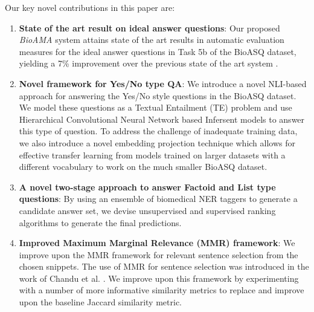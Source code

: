 \documentclass[11pt,a4paper]{article}
\begin{document}
Our key novel contributions in this paper are:
\begin{enumerate}
    \item \textbf{State of the art result on ideal answer questions}: Our proposed \textit{BioAMA} system attains state of the art results in automatic evaluation measures for the ideal answer questions in Task 5b of the BioASQ dataset, yielding a 7\%  improvement over the previous state of the art system \cite{khyati-paper}.
    \item \textbf{Novel framework for Yes/No type QA}: 
    We introduce a novel NLI-based approach for answering the Yes/No style questions in the BioASQ dataset. We model these questions as a Textual Entailment (TE) problem and use Hierarchical Convolutional Neural Network based Infersent models \cite{Infersent} to answer this type of question. To address the challenge of inadequate training data, we also introduce a novel embedding projection technique which allows for effective transfer learning from models trained on larger datasets with a different vocabulary to work on the much smaller BioASQ dataset.
    \item \textbf{A novel two-stage approach to answer Factoid and List type questions}: 
    By using an ensemble of biomedical NER taggers to generate a candidate answer set, we devise unsupervised and supervised ranking algorithms to generate the final predictions.
    \item \textbf{Improved Maximum Marginal Relevance (MMR) framework}: We improve upon the MMR framework for relevant sentence selection from the chosen snippets. The use of MMR for sentence selection was introduced in the work of Chandu et al. . We improve upon this framework by experimenting with a number of more informative similarity metrics to replace and improve upon the baseline Jaccard similarity metric.

\end{enumerate}
    
\end{document}
